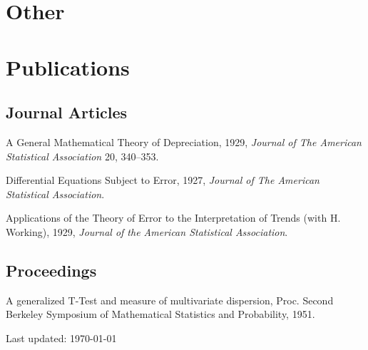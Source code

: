 \documentclass[letterpaper,12pt]{article}
\def\footerlink{}
\renewenvironment{itemize}{
  \begin{list}{}{
    \setlength{\leftmargin}{1.5em}
  }
}{
  \end{list}
}
\begin{document}
\section*{Other}
\begin{itemize}
\item 
\end{itemize}


\section*{Publications}

\subsection*{Journal Articles}

\begin{itemize}
\item A General Mathematical Theory of Depreciation, 1929, {\it Journal
    of The American Statistical Association} 20, 340--353.
\item Differential Equations Subject to Error, 1927, {\it Journal of The
    American Statistical Association}.
\item Applications of the Theory of Error to the Interpretation of
  Trends (with H. Working), 1929, {\it Journal of the American
    Statistical Association}.
\end{itemize}

\subsection*{Proceedings}

\begin{itemize}
\item A generalized T-Test and measure of multivariate dispersion,
  Proc. Second Berkeley Symposium of Mathematical Statistics and
  Probability, 1951.
\end{itemize}

\bigskip

\begin{center}
  \begin{footnotesize}
    Last updated: \today \\
    \href{\footerlink}{\texttt{\footerlink}}
  \end{footnotesize}
\end{center}
\end{document}
